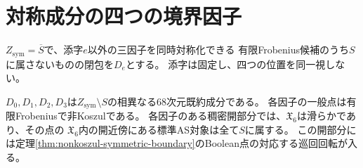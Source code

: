 \section{対称成分の四つの境界因子}
\label{sec:symmetric-boundary-divisors}
$Z_{\mathrm{sym}}=\overline S$で、添字$e$以外の三因子を同時対称化できる
有限Frobenius候補のうち$S$に属さないものの閉包を$D_e$とする。
添字は固定し、四つの位置を同一視しない。

\begin{theorem}[三因子対称境界の余次元と局所被覆]\label{thm:four-boundary-divisors}
$D_0,D_1,D_2,D_3$は$Z_{\mathrm{sym}}\setminus S$の相異なる68次元既約成分である。
各因子の一般点は有限Frobeniusで非Koszulである。
各因子のある稠密開部分では、$\mathfrak X_6$は滑らかであり、その点の
$\mathfrak X_6$内の開近傍にある標準AS対象は全て$S$に属する。
この開部分には定理\ref{thm:nonkoszul-symmetric-boundary}のBoolean点の対応する巡回回転が入る。
\end{theorem}
